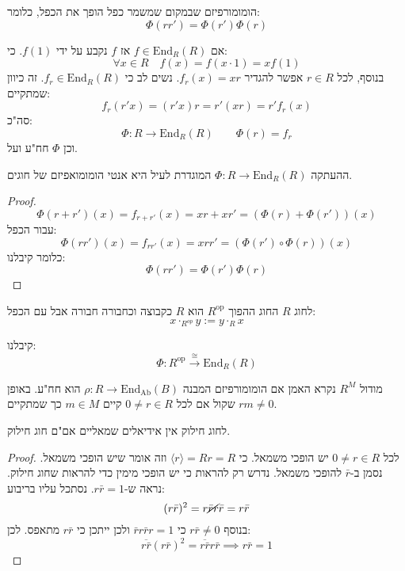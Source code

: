 \documentclass{tstextbook}
\begin{document}
\begin{definition}
הומומורפיזם שבמקום שמשמר כפל הופך את הכפל, כלומר:
$$\Phi(rr')=\Phi(r')\Phi(r)$$

\end{definition}
\begin{reminder}
אם \(f \in \mathrm{End}_{R}(R)\) אז \(f\) נקבע על ידי \(f(1)\). כי:
$$\forall x \in R\quad f(x)=f(x\cdot 1)=xf(1)$$
בנוסף, לכל \(r \in R\) אפשר להגדיר \(f_{r}(x)=xr\). נשים לב כי \(f_{r}\in \mathrm{End}_{R}(R)\). זה כיוון שמתקיים:
$$f_{r}(r'x)=(r'x)r=r'(xr)=r'f_{r}(x)$$
סה"כ:
$$\Phi:R\to \mathrm{End}_{R}(R)\qquad \Phi(r)=f_{r}$$
וכן \(\Phi\) חח"ע ועל.

\end{reminder}
\begin{proposition}
ההעתקה \(\Phi:R\to \mathrm{End}_{R}(R)\) המוגדרת לעיל היא אנטי הומומואפיזם של חוגים.

\end{proposition}
\begin{proof}
$$\Phi(r+r')(x)=f_{r+r'}(x)=xr+xr'=(\Phi(r)+\Phi(r'))(x)$$
עבור הכפל:
$$\Phi(rr')(x)=f_{rr'}(x)=xrr'=(\Phi(r')\circ  \Phi(r))(x)$$
כלומר קיבלנו:
$$\Phi(rr')=\Phi(r')\Phi(r)$$

\end{proof}
\begin{definition}
לחוג \(R\) החוג ההפוך \(R^{\text{op}}\) הוא \(R\) כקבוצה וכחבורה חבורה אבל עם הכפל:
$$x\cdot_{R^{op}}y := y\cdot_{R} x$$

\end{definition}
\begin{corollary}
קיבלנו:
$$\Phi:R^{\text{op}}\xrightarrow{\cong }\mathrm{End}_{R}(R)$$

\end{corollary}
\begin{definition}
מודול \(R^{M}\) נקרא האמן אם הומומורפיזם המבנה \(\rho:R\to \mathrm{End_{Ab}}(B)\) הוא חח"ע. באופן שקול אם לכל \(0\neq r \in R\) קיים \(m \in M\) כך שמתקיים \(r m \neq 0\).

\end{definition}
\begin{lemma}
לחוג חילוק אין אידיאלים שמאליים אם"ם חוג חילוק.

\end{lemma}
\begin{proof}
לכל \(0\neq r \in R\) יש הופכי משמאל. כי \(\langle r \rangle=Rr=R\) וזה אומר שיש הופכי משמאל. נסמן ב-\(\bar{r}\) להופכי משמאל. נדרש רק להראות כי יש הופכי מימין כדי להראות שחוג חילוק. נראה ש-\(r\bar{r}=1\). נסתכל עליו בריבוע:
$$(r\bar{r})^{2}=r\cancel{ \bar{r}r }\bar{r}=r\bar{r}$$
בנוסף \(r\bar{r}\neq 0\) כי \(\bar{r}r\bar{r}r=1\) ולכן ייתכן כי \(r\bar{r}\) מתאפס.
לכן:
$$\overline{r\bar{r}} (r\bar{r})^{2}=\overline{r\bar{r}} r\bar{r}\implies r\bar{r}=1$$

\end{proof}
\end{document}

